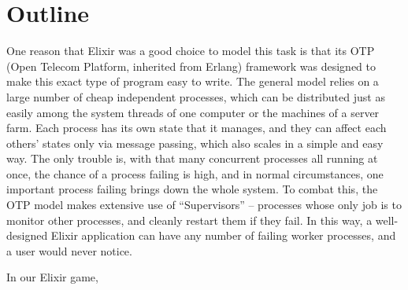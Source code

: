 \documentclass[letterpaper]{article}
\begin{document}
	\section{Outline}

	One reason that Elixir was a good choice to model this task is that its OTP (Open Telecom Platform, inherited from Erlang) framework was designed to make this exact type of program easy to write. The general model relies on a large number of cheap independent processes, which can be distributed just as easily among the system threads of one computer or the machines of a server farm. Each process has its own state that it manages, and they can affect each others' states only via message passing, which also scales in a simple and easy way. The only trouble is, with that many concurrent processes all running at once, the chance of a process failing is high, and in normal circumstances, one important process failing brings down the whole system. To combat this, the OTP model makes extensive use of ``Supervisors'' -- processes whose only job is to monitor other processes, and cleanly restart them if they fail. In this way, a well-designed Elixir application can have any number of failing worker processes, and a user would never notice.

	In our Elixir game, 
\end{document}
